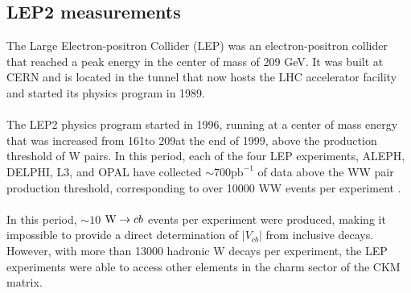 \subsection{LEP2 measurements}
The Large Electron-positron Collider (LEP) was an electron-positron collider that reached a peak energy in the center of mass of 209 GeV. It was built at CERN and is located in the tunnel that now hosts the LHC accelerator facility and started its physics program in 1989.\\
\\
The LEP2 physics program started in 1996, running at a center of mass energy  that was increased from 161\GeV to 209\GeV at the end of 1999, above the production threshold of W pairs. 
In this period, each of the four LEP experiments, ALEPH, DELPHI, L3, and OPAL have collected  $\sim700 \text{pb}^{-1}$ of data above the WW pair production threshold, corresponding to over 10000 WW events per experiment \cite{Lu2008WLEP}.\\
\\
In this period, $\sim 10$ ${\text{W}} \to cb$ events per experiment were produced, making it impossible to provide a direct determination of $|V_{cb}|$ from inclusive \PW decays.\\
However, with more than 13000 hadronic W decays per experiment, the LEP experiments were able to access other elements in the charm sector of the CKM matrix.


